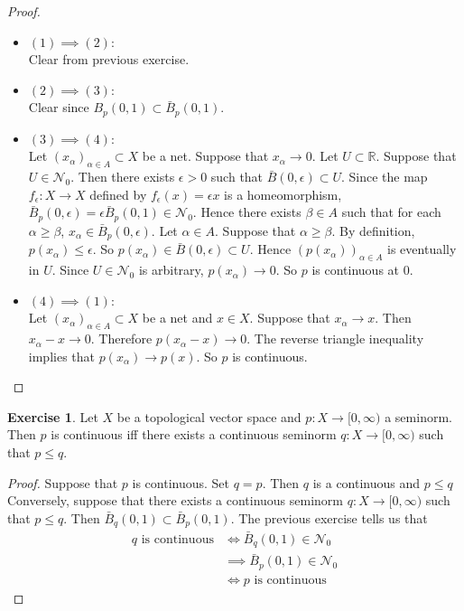 \documentclass[12pt]{amsart}
\theoremstyle{definition}
\newtheorem{ex}[definition]{Exercise}
\newcommand{\al}{\alpha}
\newcommand{\ep}{\epsilon}
\newcommand{\R}{\mathbb{R}}
\newcommand{\MN}{\mathcal{N}}
\newcommand{\Rg}{[0,\infty)}
\DeclareMathOperator*{\0}{\mbf{0}}
\DeclareMathOperator*{\1}{\mbf{1}}
\begin{document}
	\begin{proof}\
		\begin{itemize}
			\item $(1) \implies (2)$: \\
			Clear from previous exercise. \\
			\item $(2) \implies (3)$: \\
			Clear since $B_p(0,1) \subset \bar{B}_p(0,1)$. \\
			\item $(3) \implies (4)$: \\
			Let $(x_{\al})_{\al \in A} \subset X$ be a net. Suppose that $x_{\al} \rightarrow 0$. Let $U \subset \R$. Suppose that $U \in \MN_0$. Then there exists $\ep > 0$ such that $\bar{B}(0, \ep) \subset U$. Since the map $f_{\ep}: X \rightarrow X$ defined by $f_{\ep}(x) = \ep x$ is a homeomorphism, $\bar{B}_p(0,\ep) = \ep \bar{B}_p(0,1) \in \MN_0$. Hence there exists $\beta \in A$ such that for each $\al \geq \beta$, $x_{\al} \in \bar{B}_p(0, \ep)$. Let $\al \in A$. Suppose that $\al \geq \beta$. By definition, $p(x_{\al}) \leq \ep$. So $p(x_{\al}) \in \bar{B}(0,\ep) \subset U$. Hence $(p(x_{\al}))_{\al \in A}$ is eventually in $U$. Since $U \in \MN_0$ is arbitrary, $p(x_{\al}) \rightarrow 0$. So $p$ is continuous at $0$. \\
			\item $(4) \implies (1)$: \\
			Let $(x_{\al})_{\al \in A} \subset X$ be a net and $x \in X$. Suppose that $x_{\al} \rightarrow x$. Then $x_{\al} - x \rightarrow 0$. Therefore $p(x_{\al} - x) \rightarrow 0$. The reverse triangle inequality implies that $p(x_{\al}) \rightarrow p(x)$. So $p$ is continuous.
		\end{itemize}
	\end{proof}

	\begin{ex}
		Let $X$ be a topological vector space and $p:X \rightarrow \Rg$ a seminorm. Then $p$ is continuous iff there exists a continuous seminorm $q: X \rightarrow \Rg$ such that $p \leq q$. 
	\end{ex}

	\begin{proof}
		Suppose that $p$ is continuous. Set $q = p$. Then $q$ is a continuous and $p \leq q$\\
		Conversely, suppose that there exists a continuous seminorm $q:X \rightarrow \Rg$ such that $p \leq q$. Then $\bar{B}_q(0,1) \subset \bar{B}_p(0,1)$. The previous exercise tells us that 
		\begin{align*}
			q \text{ is continuous} 
			& \iff \bar{B}_q(0,1) \in \MN_0 \\
			& \implies \bar{B}_p(0,1) \in \MN_0 \\
			& \iff p \text{ is continuous} 
		\end{align*}
	\end{proof}
\end{document}
